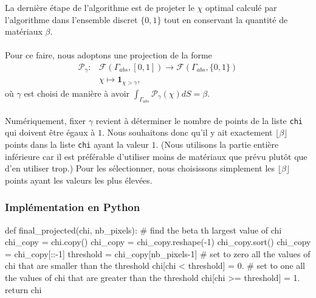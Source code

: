 La dernière étape de l'algorithme est de projeter le $\chi$ optimal calculé par l'algorithme dans l'ensemble discret $\{0,1\}$ tout en conservant la quantité de matériaux $\beta$.\\ \\
Pour ce faire, nous adoptons une projection de la forme 
\begin{align*}
    \mathcal{P_\mathcal{\gamma}} 
    \colon& \mathcal{F}(\Gamma_{abs}, [0, 1]) \longrightarrow \mathcal{F}(\Gamma_{abs},\{0,1\}) \\
    &\chi \mapsto \mathbf{1}_{\chi > \gamma},
\end{align*}
où $\gamma$ est choisi de manière à avoir $\displaystyle \int_{\Gamma_{abs}} \mathcal{P_\mathcal{\gamma}} (\chi)dS = \beta$. \\ \\
Numériquement, fixer $\gamma$ revient à déterminer le nombre de points de la liste \texttt{chi} qui doivent être égaux à $1$. Nous souhaitons donc qu'il y ait exactement $\lfloor \beta \rfloor$ points dans la liste \texttt{chi} ayant la valeur $1$. (Nous utilisons la partie entière inférieure car il est préférable d'utiliser moins de matériaux que prévu plutôt que d'en utiliser trop.) Pour les sélectionner, nous choisissons simplement les $\lfloor \beta \rfloor$ points ayant les valeurs les plus élevées.

\subsubsection{Implémentation en Python}

\begin{Python}
def final_projected(chi, nb_pixels):
    # find the beta th largest value of chi
    chi_copy = chi.copy()
    chi_copy = chi_copy.reshape(-1)
    chi_copy.sort()
    chi_copy = chi_copy[::-1]
    threshold = chi_copy[nb_pixels-1]
    # set to zero all the values of chi that are smaller than the threshold
    chi[chi < threshold] = 0.
    # set to one all the values of chi that are greater than the threshold
    chi[chi >= threshold] = 1.
    return chi
\end{Python}